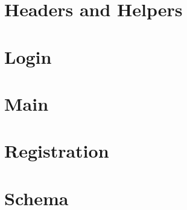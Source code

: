 \documentclass{article}
\title{\Title}
\author{\Author}
\date{\Date}
\begin{document}
\section{Headers and Helpers}




\newpage

\section{Login}


\newpage

\section{Main}


\newpage

\section{Registration}


\newpage

\section{Schema}


\newpage
\end{document}
